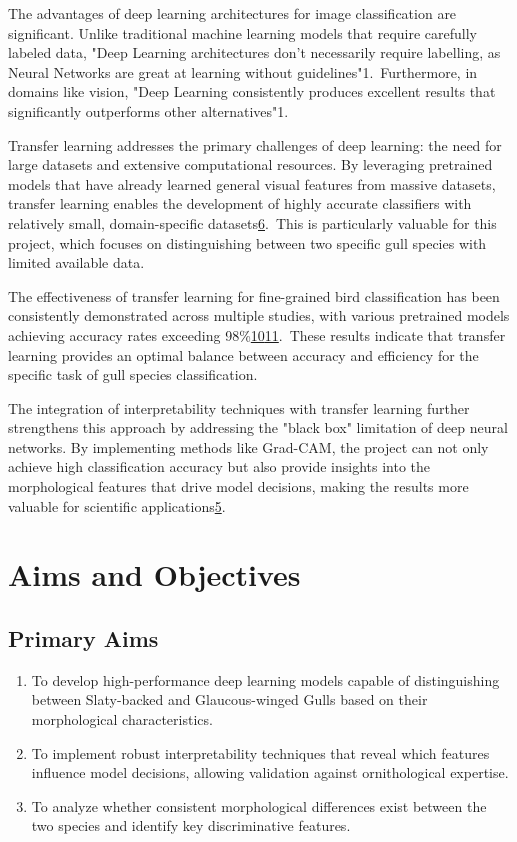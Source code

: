 \documentclass[a4paper,12pt]{article}
\begin{document}
The advantages of deep learning architectures for image classification are significant. Unlike traditional machine learning models that require carefully labeled data, "Deep Learning architectures don't necessarily require labelling, as Neural Networks are great at learning without guidelines"1. Furthermore, in domains like vision, "Deep Learning consistently produces excellent results that significantly outperforms other alternatives"1.

Transfer learning addresses the primary challenges of deep learning: the need for large datasets and extensive computational resources. By leveraging pretrained models that have already learned general visual features from massive datasets, transfer learning enables the development of highly accurate classifiers with relatively small, domain-specific datasets\href{https://arxiv.org/abs/2201.09679}{6}. This is particularly valuable for this project, which focuses on distinguishing between two specific gull species with limited available data.

The effectiveness of transfer learning for fine-grained bird classification has been consistently demonstrated across multiple studies, with various pretrained models achieving accuracy rates exceeding 98\%\href{https://www.semanticscholar.org/paper/41b0718279f408654094557156d4eeeb0067b2c4}{10}\href{https://www.semanticscholar.org/paper/770ee68d1b136cd098a018a399d1f69af29faae0}{11}. These results indicate that transfer learning provides an optimal balance between accuracy and efficiency for the specific task of gull species classification.

The integration of interpretability techniques with transfer learning further strengthens this approach by addressing the "black box" limitation of deep neural networks. By implementing methods like Grad-CAM, the project can not only achieve high classification accuracy but also provide insights into the morphological features that drive model decisions, making the results more valuable for scientific applications\href{https://www.atlantis-press.com/article/125986223.pdf}{5}.

\section*{Aims and Objectives}

\subsection*{Primary Aims}
\begin{enumerate}
    \item To develop high-performance deep learning models capable of distinguishing between Slaty-backed and Glaucous-winged Gulls based on their morphological characteristics.
    \item To implement robust interpretability techniques that reveal which features influence model decisions, allowing validation against ornithological expertise.
    \item To analyze whether consistent morphological differences exist between the two species and identify key discriminative features.
\end{enumerate}
\end{document}
